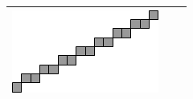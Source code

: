 \documentclass[12pt, a4paper]{article}
\begin{document}
\begin{minipage}{\textwidth}
\begin{table}[H]
\begin{tabulary}{\linewidth}{|C|C|C|}
					\includegraphics[width=0.9\linewidth]{option6}
					\\ \hline
				\end{tabulary}
			\end{table}
	\end{minipage} \\ \\
	
\end{document}
